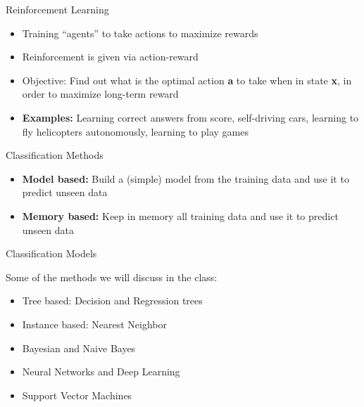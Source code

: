 \documentclass{beamer}
\begin{document}
\begin{frame}{Reinforcement Learning}
    \begin{itemize}
        \item Training ``agents'' to take actions to maximize rewards
        \item Reinforcement is given via action-reward
        \item Objective: Find out what is the optimal action {\bf a} to take when in state {\bf x}, in order to maximize long-term reward
        \item {\bf Examples:} Learning correct answers from score, self-driving cars, learning to fly helicopters autonomously, learning to play games
    \end{itemize}
\end{frame}


\begin{frame}{Classification Methods}
    \begin{itemize}
        \item {\bf Model based:} Build a (simple) model from the training data and use it to predict unseen data
        \item {\bf Memory based:} Keep in memory all training data and use it to predict unseen data
    \end{itemize}
\end{frame}


\begin{frame}{Classification Models}

    Some of the methods we will discuss in the class:
    \begin{itemize}
        \item Tree based: Decision and Regression trees
        \item Instance based: Nearest Neighbor 
        \item Bayesian and Naive Bayes
        \item Neural Networks and Deep Learning
        \item Support Vector Machines
    \end{itemize}
\end{frame}
\end{document}
